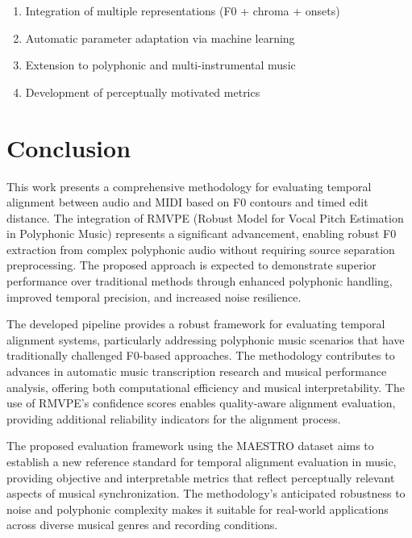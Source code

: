 \documentclass[12pt,a4paper]{article}
\begin{document}
\begin{enumerate}
    \item Integration of multiple representations (F0 + chroma + onsets)
    \item Automatic parameter adaptation via machine learning
    \item Extension to polyphonic and multi-instrumental music
    \item Development of perceptually motivated metrics
\end{enumerate}

\section{Conclusion}
\label{sec:conclusao}

This work presents a comprehensive methodology for evaluating temporal alignment between audio and MIDI based on F0 contours and timed edit distance. The integration of RMVPE (Robust Model for Vocal Pitch Estimation in Polyphonic Music) represents a significant advancement, enabling robust F0 extraction from complex polyphonic audio without requiring source separation preprocessing. The proposed approach is expected to demonstrate superior performance over traditional methods through enhanced polyphonic handling, improved temporal precision, and increased noise resilience.

The developed pipeline provides a robust framework for evaluating temporal alignment systems, particularly addressing polyphonic music scenarios that have traditionally challenged F0-based approaches. The methodology contributes to advances in automatic music transcription research and musical performance analysis, offering both computational efficiency and musical interpretability. The use of RMVPE's confidence scores enables quality-aware alignment evaluation, providing additional reliability indicators for the alignment process.

The proposed evaluation framework using the MAESTRO dataset aims to establish a new reference standard for temporal alignment evaluation in music, providing objective and interpretable metrics that reflect perceptually relevant aspects of musical synchronization. The methodology's anticipated robustness to noise and polyphonic complexity makes it suitable for real-world applications across diverse musical genres and recording conditions.
\end{document}
